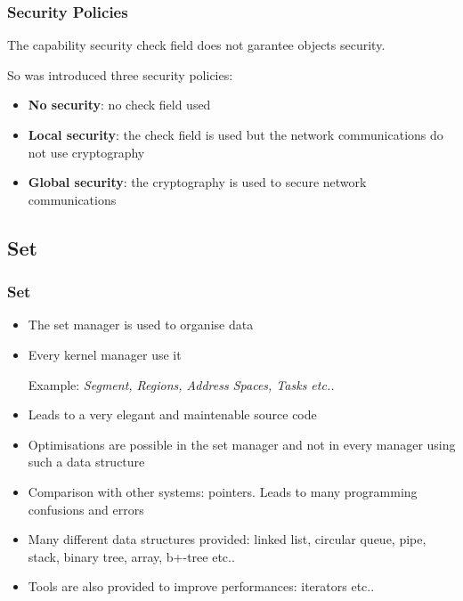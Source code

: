 \documentclass[8pt]{beamer}
\newcommand{\nl}[0]{\vspace{0.4cm}}
\begin{document}

\begin{frame}
  \frametitle{Security Policies}

  The capability security check field does not garantee objects security.

  \nl

  So was introduced three security policies:

  \begin{itemize}[<+->]
    \item
      \textbf{No security}: no check field used
    \item
      \textbf{Local security}: the check field is used but the
      network communications do not use cryptography
    \item
      \textbf{Global security}: the cryptography is used to secure
      network communications
  \end{itemize}
\end{frame}

%
%

\subsection{Set}


\begin{frame}
  \frametitle{Set}

  \begin{itemize}[<+->]
    \item
      The set manager is used to organise data
    \item
      Every kernel manager use it

      \nl

      Example: \textit{Segment, Regions, Address Spaces, Tasks etc..}
    \item
      Leads to a very elegant and maintenable source code
    \item
      Optimisations are possible in the set manager and not in every
      manager using such a data structure
    \item
      Comparison with other systems: pointers. Leads to many
      programming confusions and errors
    \item
      Many different data structures provided: linked list, circular
      queue, pipe, stack, binary tree, array, b+-tree etc..
    \item
      Tools are also provided to improve performances: iterators etc..
  \end{itemize}
\end{frame}
\end{document}

